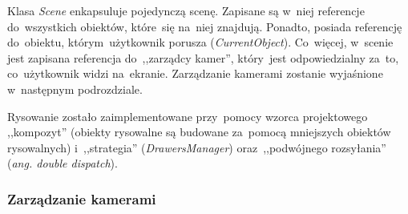 \documentclass[11pt, a4paper, oneside]{scrartcl}
\begin{document}
Klasa \textit{Scene} enkapsuluje pojedynczą scenę. Zapisane są w~niej referencje do~wszystkich obiektów, które~się na~niej znajdują.
Ponadto, posiada referencję do~obiektu, którym~użytkownik porusza (\textit{CurrentObject}).
Co~więcej, w~scenie jest zapisana referencja do~,,zarządcy kamer'', który~jest odpowiedzialny za~to, co~użytkownik widzi na~ekranie.
Zarządzanie kamerami zostanie wyjaśnione w~następnym podrozdziale.

Rysowanie zostało zaimplementowane przy~pomocy wzorca projektowego ,,kompozyt'' (obiekty rysowalne są budowane za~pomocą mniejszych
obiektów rysowalnych) i~,,strategia'' (\textit{DrawersManager}) oraz~,,podwójnego rozsyłania'' (\textit{ang. double dispatch}).

\subsubsection{Zarządzanie kamerami}
\end{document}
